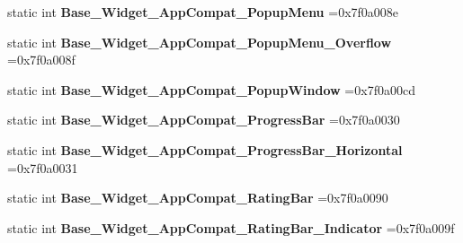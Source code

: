 \begin{DoxyCompactItemize}
\item 
\mbox{\label{classandroid_1_1support_1_1v7_1_1appcompat_1_1R_1_1style_a921e8ac1b69a75eeb7e39bb5c0c60a39}} 
static int {\bfseries Base\+\_\+\+Widget\+\_\+\+App\+Compat\+\_\+\+Popup\+Menu} =0x7f0a008e
\item 
\mbox{\label{classandroid_1_1support_1_1v7_1_1appcompat_1_1R_1_1style_a219692efc09a030517eb8f29241a8fa3}} 
static int {\bfseries Base\+\_\+\+Widget\+\_\+\+App\+Compat\+\_\+\+Popup\+Menu\+\_\+\+Overflow} =0x7f0a008f
\item 
\mbox{\label{classandroid_1_1support_1_1v7_1_1appcompat_1_1R_1_1style_ac482244f43c2c452f1040b9109606cc2}} 
static int {\bfseries Base\+\_\+\+Widget\+\_\+\+App\+Compat\+\_\+\+Popup\+Window} =0x7f0a00cd
\item 
\mbox{\label{classandroid_1_1support_1_1v7_1_1appcompat_1_1R_1_1style_a6128887a4882a87f10254abd91c8be6d}} 
static int {\bfseries Base\+\_\+\+Widget\+\_\+\+App\+Compat\+\_\+\+Progress\+Bar} =0x7f0a0030
\item 
\mbox{\label{classandroid_1_1support_1_1v7_1_1appcompat_1_1R_1_1style_aa67c8b9a2f4d9a79c75457e9e458c6dc}} 
static int {\bfseries Base\+\_\+\+Widget\+\_\+\+App\+Compat\+\_\+\+Progress\+Bar\+\_\+\+Horizontal} =0x7f0a0031
\item 
\mbox{\label{classandroid_1_1support_1_1v7_1_1appcompat_1_1R_1_1style_a4053d110873a54cb405fa3a3bc861f11}} 
static int {\bfseries Base\+\_\+\+Widget\+\_\+\+App\+Compat\+\_\+\+Rating\+Bar} =0x7f0a0090
\item 
\mbox{\label{classandroid_1_1support_1_1v7_1_1appcompat_1_1R_1_1style_a312ffcd4d0c3cd15cce53bb41f773ea8}} 
static int {\bfseries Base\+\_\+\+Widget\+\_\+\+App\+Compat\+\_\+\+Rating\+Bar\+\_\+\+Indicator} =0x7f0a009f
\item 
\mbox{\label{classandroid_1_1support_1_1v7_1_1appcompat_1_1R_1_1style_ac1151b149d7bff9a06131eeb0cbe8bf9}} 

\end{DoxyCompactItemize}
